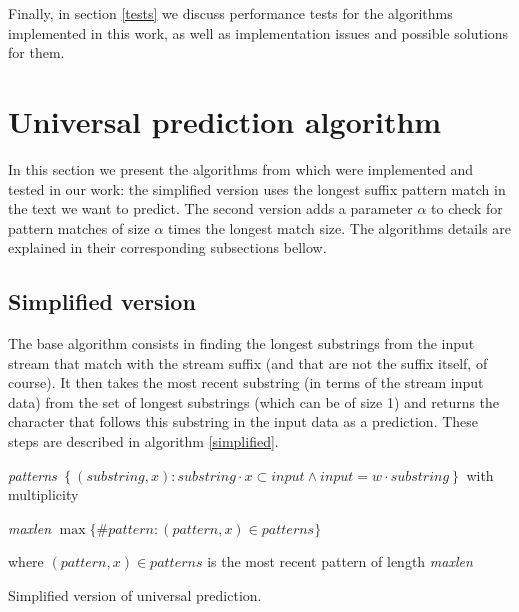 \documentclass[a4paper,12pt]{article}
\begin{document}
Finally, in section \ref{tests} we discuss performance tests for the algorithms implemented in this work, as well as implementation issues and possible solutions for them.

\section{Universal prediction algorithm}\label{paper_algos}

  In this section we present the algorithms from \cite{paper} which were implemented and tested in our work: the simplified version uses the longest suffix pattern match in the text we want to predict. The second version adds a parameter $\alpha$ to check for pattern matches of size $\alpha$ times the longest match size. The algorithms details are explained in their corresponding subsections bellow.

  \subsection{Simplified version}

  The base algorithm consists in finding the longest substrings from the input stream that match with the stream suffix (and that are not the suffix itself, of course). It then takes the most recent substring (in terms of the stream input data) from the set of longest substrings (which can be of size 1) and returns the character that follows this substring in the input data as a prediction. These steps are described in algorithm \ref{simplified}.


    \begin{algorithm}

      \textit{patterns} \gets{}
        $\left\{ (\textit{substring},x) :%
        \textit{substring}\cdot x\subset\textit{input} \wedge
        \textit{input} = w\cdot\textit{substring} \right\}$
        with multiplicity\;

      \textit{maxlen} \gets{} $\max\{\#\textit{pattern} :
        (\textit{pattern},x)\in\textit{patterns}\}$\;

       where $(\textit{pattern},x)\in\textit{patterns}$ is the most
        recent pattern of length \textit{maxlen}\;

      \caption{\label{simplified}Simplified version of universal prediction.}
    \end{algorithm}
\end{document}
